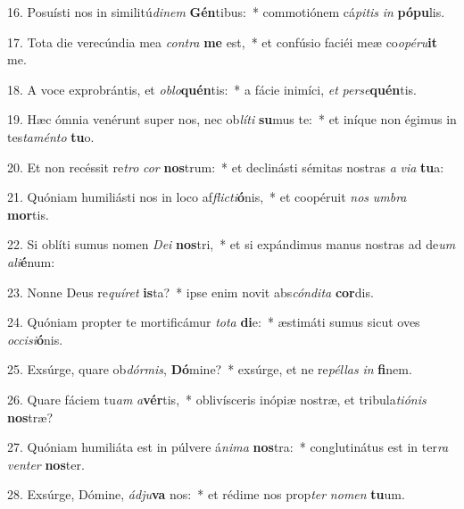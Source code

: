 16. Posuísti nos in similitú\textit{di}\textit{nem} \textbf{Gén}tibus:~*  commotiónem cá\textit{pi}\textit{tis} \textit{in} \textbf{pó}\textbf{pu}lis.\

17. Tota die verecúndia mea \textit{con}\textit{tra} \textbf{me} est,~*  et confúsio faciéi meæ co\textit{o}\textit{pé}\textit{ru}\textbf{it} me.\

18. A voce exprobrántis, et \textit{ob}\textit{lo}\textbf{quén}tis:~*  a fácie inimíci, \textit{et} \textit{per}\textit{se}\textbf{quén}tis.\

19. Hæc ómnia venérunt super nos, nec ob\textit{lí}\textit{ti} \textbf{su}mus te:~*  et iníque non égimus in tes\textit{ta}\textit{mén}\textit{to} \textbf{tu}o.\

20. Et non recéssit re\textit{tro} \textit{cor} \textbf{nos}trum:~*  et declinásti sémitas nostras \textit{a} \textit{vi}\textit{a} \textbf{tu}a:\

21. Quóniam humiliásti nos in loco af\textit{flic}\textit{ti}\textbf{ó}nis,~*  et coopéruit \textit{nos} \textit{um}\textit{bra} \textbf{mor}tis.\

22. Si oblíti sumus nomen \textit{De}\textit{i} \textbf{nos}tri,~*  et si expándimus manus nostras ad de\textit{um} \textit{a}\textit{li}\textbf{é}num:\

23. Nonne Deus re\textit{quí}\textit{ret} \textbf{is}ta?~*  ipse enim novit abs\textit{cón}\textit{di}\textit{ta} \textbf{cor}dis.\

24. Quóniam propter te mortificámur \textit{to}\textit{ta} \textbf{di}e:~*  æstimáti sumus sicut oves \textit{oc}\textit{ci}\textit{si}\textbf{ó}nis.\

25. Exsúrge, quare ob\textit{dór}\textit{mis}, \textbf{Dó}mine?~*  exsúrge, et ne re\textit{pél}\textit{las} \textit{in} \textbf{fi}nem.\

26. Quare fáciem tu\textit{am} \textit{a}\textbf{vér}tis,~*  oblivísceris inópiæ nostræ, et tribula\textit{ti}\textit{ó}\textit{nis} \textbf{nos}træ?\

27. Quóniam humiliáta est in púlvere á\textit{ni}\textit{ma} \textbf{nos}tra:~*  conglutinátus est in ter\textit{ra} \textit{ven}\textit{ter} \textbf{nos}ter.\

28. Exsúrge, Dómine, \textit{ád}\textit{ju}\textbf{va} nos:~*  et rédime nos prop\textit{ter} \textit{no}\textit{men} \textbf{tu}um.\

